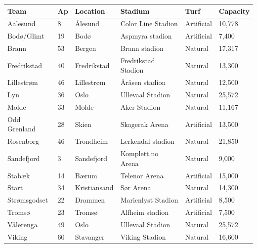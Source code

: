 \documentclass{article}
\begin{document}
\begin{tabular}{llllll}
\toprule
Team & Ap & Location & Stadium & Turf & Capacity \\
\midrule
Aalesund & 8 & Ålesund & Color Line Stadion & Artificial & 10,778 \\
Bodø/Glimt & 19 & Bodø & Aspmyra stadion & Artificial & 7,400 \\
Brann & 53 & Bergen & Brann stadion & Natural & 17,317 \\
Fredrikstad & 40 & Fredrikstad & Fredrikstad Stadion & Natural & 13,300 \\
Lillestrøm & 46 & Lillestrøm & Åråsen stadion & Natural & 12,500 \\
Lyn & 36 & Oslo & Ullevaal Stadion & Natural & 25,572 \\
Molde & 33 & Molde & Aker Stadion & Natural & 11,167 \\
Odd Grenland & 28 & Skien & Skagerak Arena & Artificial & 13,500 \\
Rosenborg & 46 & Trondheim & Lerkendal stadion & Natural & 21,850 \\
Sandefjord & 3 & Sandefjord & Komplett.no Arena & Natural & 9,000 \\
Stabæk & 14 & Bærum & Telenor Arena & Artificial & 15,000 \\
Start & 34 & Kristiansand & Sør Arena & Natural & 14,300 \\
Strømsgodset & 22 & Drammen & Marienlyst Stadion & Artificial & 8,500 \\
Tromsø & 23 & Tromsø & Alfheim stadion & Artificial & 7,500 \\
Vålerenga & 49 & Oslo & Ullevaal Stadion & Natural & 25,572 \\
Viking & 60 & Stavanger & Viking Stadion & Natural & 16,600 \\
\bottomrule
\end{tabular}
\end{document}
